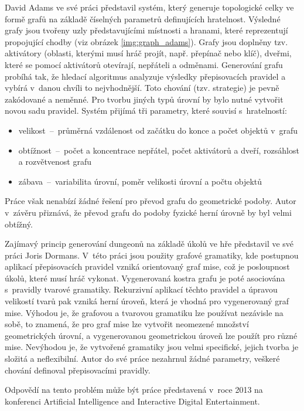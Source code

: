 David Adams ve své práci\cite{lit:graph_adams} představil systém, který generuje topologické celky ve formě grafů na základě číselných parametrů definujících hratelnost.
Výsledné grafy jsou tvořeny uzly představujícími místnosti a hranami, které reprezentují propojující chodby (viz obrázek \ref{img:graph_adams}).
Grafy jsou doplněny tzv. aktivátory (oblasti, kterými musí hráč projít, např. přepínač nebo klíč), dveřmi, které se pomocí aktivátorů otevírají, nepřáteli a odměnami.
Generování grafu probíhá tak, že hledací algoritmus analyzuje výsledky přepisovacích pravidel a vybírá v~danou chvíli to nejvhodnější.
Toto chování (tzv. strategie) je pevně zakódované a neměnné.
Pro tvorbu jiných typů úrovní by bylo nutné vytvořit novou sadu pravidel.
Systém přijímá tři parametry, které souvisí s~hratelností:
\begin{itemize}
\item velikost~--~průměrná vzdálenost od začátku do konce a počet objektů v~grafu
\item obtížnost~--~počet a koncentrace nepřátel, počet aktivátorů a dveří, rozsáhlost a rozvětvenost grafu
\item zábava~--~variabilita úrovní, poměr velikosti úrovní a počtu objektů
\end{itemize}
Práce však nenabízí žádné řešení pro převod grafu do geometrické podoby.
Autor v~závěru přiznává, že převod grafu do podoby fyzické herní úrovně by byl velmi obtížný.
\par
Zajímavý princip generování dungeonů na základě úkolů ve hře představil ve své práci Joris Dormans\cite{lit:graph_dormans}.
V~této práci jsou použity grafové gramatiky, kde postupnou aplikací přepisovacích pravidel vzniká orientovaný graf mise, což je posloupnost úkolů, které musí hráč vykonat.
Vygenerovaná kostra grafu je poté asociována s~pravidly tvarové gramatiky.
Rekurzivní aplikací těchto pravidel a úpravou velikostí tvarů pak vzniká herní úroveň, která je vhodná pro vygenerovaný graf mise.
Výhodou je, že grafovou a tvarovou gramatiku lze používat nezávisle na sobě, to znamená, že pro graf mise lze vytvořit neomezené množství geometrických úrovní, a vygenerovanou geometrickou úroveň lze použít pro různé mise.
Nevýhodou je, že vytvořené gramatiky jsou velmi specifické, jejich tvorba je složitá a neflexibilní.
Autor do své práce nezahrnul žádné parametry, veškeré chování definoval přepisovacími pravidly.
\par
Odpovědí na tento problém může být práce\cite{lit:graph_der_linden} představená v~roce 2013 na konferenci Artificial Intelligence and Interactive Digital Entertainment.
